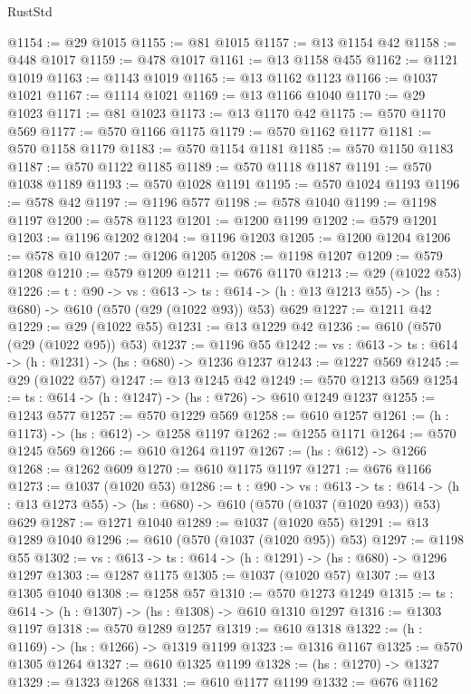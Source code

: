 \begin{lexlean}{RustStd}
\begin{coremodule}
@1154 := @29 @1015
@1155 := @81 @1015
@1157 := @13 @1154 @42
@1158 := @448 @1017
@1159 := @478 @1017
@1161 := @13 @1158 @455
@1162 := @1121 @1019
@1163 := @1143 @1019
@1165 := @13 @1162 @1123
@1166 := @1037 @1021
@1167 := @1114 @1021
@1169 := @13 @1166 @1040
@1170 := @29 @1023
@1171 := @81 @1023
@1173 := @13 @1170 @42
@1175 := @570 @1170 @569
@1177 := @570 @1166 @1175
@1179 := @570 @1162 @1177
@1181 := @570 @1158 @1179
@1183 := @570 @1154 @1181
@1185 := @570 @1150 @1183
@1187 := @570 @1122 @1185
@1189 := @570 @1118 @1187
@1191 := @570 @1038 @1189
@1193 := @570 @1028 @1191
@1195 := @570 @1024 @1193
@1196 := @578 @42
@1197 := @1196 @577
@1198 := @578 @1040
@1199 := @1198 @1197
@1200 := @578 @1123
@1201 := @1200 @1199
@1202 := @579 @1201
@1203 := @1196 @1202
@1204 := @1196 @1203
@1205 := @1200 @1204
@1206 := @578 @10
@1207 := @1206 @1205
@1208 := @1198 @1207
@1209 := @579 @1208
@1210 := @579 @1209
@1211 := @676 @1170
@1213 := @29 (@1022 @53)
@1226 := {t : @90} ->
  {vs : @613} ->
  {ts : @614} -> (h : @13 @1213 @55) -> (hs : @680) -> @610 (@570 (@29 (@1022 @93)) @53) @629
@1227 := @1211 @42
@1229 := @29 (@1022 @55)
@1231 := @13 @1229 @42
@1236 := @610 (@570 (@29 (@1022 @95)) @53)
@1237 := @1196 @55
@1242 := {vs : @613} -> {ts : @614} -> (h : @1231) -> (hs : @680) -> @1236 @1237
@1243 := @1227 @569
@1245 := @29 (@1022 @57)
@1247 := @13 @1245 @42
@1249 := @570 @1213 @569
@1254 := {ts : @614} -> (h : @1247) -> (hs : @726) -> @610 @1249 @1237
@1255 := @1243 @577
@1257 := @570 @1229 @569
@1258 := @610 @1257
@1261 := (h : @1173) -> (hs : @612) -> @1258 @1197
@1262 := @1255 @1171
@1264 := @570 @1245 @569
@1266 := @610 @1264 @1197
@1267 := (hs : @612) -> @1266
@1268 := @1262 @609
@1270 := @610 @1175 @1197
@1271 := @676 @1166
@1273 := @1037 (@1020 @53)
@1286 := {t : @90} ->
  {vs : @613} ->
  {ts : @614} -> (h : @13 @1273 @55) -> (hs : @680) -> @610 (@570 (@1037 (@1020 @93)) @53) @629
@1287 := @1271 @1040
@1289 := @1037 (@1020 @55)
@1291 := @13 @1289 @1040
@1296 := @610 (@570 (@1037 (@1020 @95)) @53)
@1297 := @1198 @55
@1302 := {vs : @613} -> {ts : @614} -> (h : @1291) -> (hs : @680) -> @1296 @1297
@1303 := @1287 @1175
@1305 := @1037 (@1020 @57)
@1307 := @13 @1305 @1040
@1308 := @1258 @57
@1310 := @570 @1273 @1249
@1315 := {ts : @614} -> (h : @1307) -> (hs : @1308) -> @610 @1310 @1297
@1316 := @1303 @1197
@1318 := @570 @1289 @1257
@1319 := @610 @1318
@1322 := (h : @1169) -> (hs : @1266) -> @1319 @1199
@1323 := @1316 @1167
@1325 := @570 @1305 @1264
@1327 := @610 @1325 @1199
@1328 := (hs : @1270) -> @1327
@1329 := @1323 @1268
@1331 := @610 @1177 @1199
@1332 := @676 @1162

\end{coremodule}
\end{lexlean}
